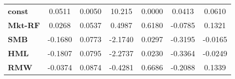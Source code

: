 \begin{center}
\begin{tabular}{lcccccc}
\midrule
\textbf{const}  &       0.0511       &       0.0050       &      10.215     &      0.0000      &       0.0413      &       0.0610       \\
\textbf{Mkt-RF} &       0.0268       &       0.0537       &      0.4987     &      0.6180      &      -0.0785      &       0.1321       \\
\textbf{SMB}    &      -0.1680       &       0.0773       &     -2.1740     &      0.0297      &      -0.3195      &      -0.0165       \\
\textbf{HML}    &      -0.1807       &       0.0795       &     -2.2737     &      0.0230      &      -0.3364      &      -0.0249       \\
\textbf{RMW}    &      -0.0374       &       0.0874       &     -0.4281     &      0.6686      &      -0.2088      &       0.1339       \\
\bottomrule
\end{tabular}
\end{center}
